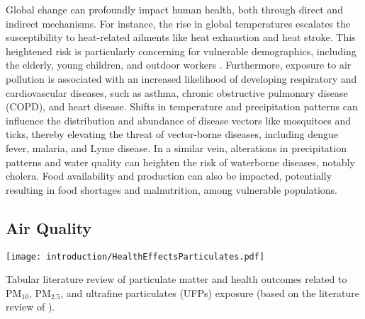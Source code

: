Global change can profoundly impact human health, both through direct and indirect mechanisms. For instance, the rise in global temperatures escalates the susceptibility to heat-related ailments like heat exhaustion and heat stroke. This heightened risk is particularly concerning for vulnerable demographics, including the elderly, young children, and outdoor workers \cite{WHO2018, Costello2009, Haines2006}. Furthermore, exposure to air pollution is associated with an increased likelihood of developing respiratory and cardiovascular diseases, such as asthma, chronic obstructive pulmonary disease (COPD), and heart disease. Shifts in temperature and precipitation patterns can influence the distribution and abundance of disease vectors like mosquitoes and ticks, thereby elevating the threat of vector-borne diseases, including dengue fever, malaria, and Lyme disease. In a similar vein, alterations in precipitation patterns and water quality can heighten the risk of waterborne diseases, notably cholera. Food availability and production can also be impacted, potentially resulting in food shortages and malnutrition, among vulnerable populations.


\subsection{Air Quality}

\begin{table}[h!]
  \centering
  \texttt{[image: introduction/HealthEffectsParticulates.pdf]}
	\caption{Tabular literature review of particulate matter and health outcomes related to PM$_{10}$, PM$_{2.5}$, and ultrafine particulates (UFPs) exposure (based on the literature review of \cite{Lary:2015}).}
	\label{Table.HealthEffectsParticulates}
\end{table}


